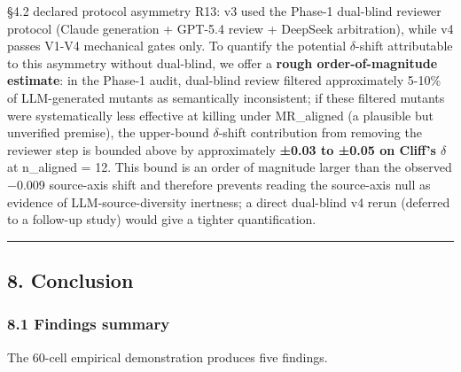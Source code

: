 \documentclass[review,12pt,authoryear]{elsarticle}
\begin{document}
§4.2 declared protocol asymmetry R13: v3 used the Phase-1 dual-blind
reviewer protocol (Claude generation + GPT-5.4 review + DeepSeek
arbitration), while v4 passes V1-V4 mechanical gates only. To quantify
the potential $\delta$-shift attributable to this asymmetry without dual-blind,
we offer a \textbf{rough order-of-magnitude estimate}: in the Phase-1
audit, dual-blind review filtered approximately 5-10\% of LLM-generated
mutants as semantically inconsistent; if these filtered mutants were
systematically less effective at killing under MR\_aligned (a plausible
but unverified premise), the upper-bound $\delta$-shift contribution from
removing the reviewer step is bounded above by approximately
\textbf{±0.03 to ±0.05 on Cliff's $\delta$} at n\_aligned = 12. This bound is
an order of magnitude larger than the observed −0.009 source-axis shift
and therefore prevents reading the source-axis null as evidence of
LLM-source-diversity inertness; a direct dual-blind v4 rerun (deferred
to a follow-up study) would give a tighter quantification.

\begin{center}\rule{0.5\linewidth}{0.5pt}\end{center}

\subsection{8. Conclusion}\label{conclusion}

\subsubsection{8.1 Findings summary}\label{findings-summary}

The 60-cell empirical demonstration produces five findings.
\end{document}
